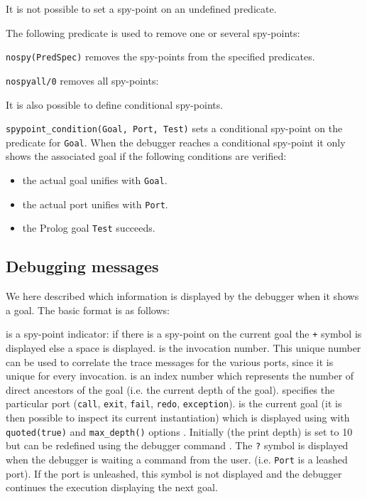 It is not possible to set a spy-point on an undefined predicate. 

The following predicate is used to remove one or several spy-points:

\texttt{nospy(PredSpec)} removes the spy-points from the specified
predicates.

\texttt{nospyall/0} removes all spy-points:

It is also possible to define conditional spy-points. 

\texttt{spypoint\_condition(Goal, Port, Test)} sets a
conditional spy-point on the predicate for \texttt{Goal}. When the debugger
reaches a conditional spy-point it only shows the associated goal if the 
following conditions are verified:

\begin{itemize}

\item the actual goal unifies with \texttt{Goal}.

\item the actual port unifies with \texttt{Port}.

\item the Prolog goal \texttt{Test} succeeds.

\end{itemize}

\subsection{Debugging messages}
We here described which information is displayed by the debugger when it
shows a goal. The basic format is as follows: 


 is a spy-point indicator: if there is a spy-point on the
current goal the \texttt{+} symbol is displayed else a space is displayed.
 is the invocation number. This unique number can be used
to correlate the trace messages for the various ports, since it is unique
for every invocation.  is an index number which
represents the number of direct ancestors of the goal (i.e. the current
depth of the goal).  specifies the particular port
(\texttt{call}, \texttt{exit}, \texttt{fail}, \texttt{redo},
\texttt{exception}).  is the current goal (it is then
possible to inspect its current instantiation) which is displayed using
 with \texttt{quoted(true)} and
\texttt{max\_depth()} options . Initially
 (the print depth) is set to 10 but can be redefined
using the \texttt{{\lt}} debugger command . The
\texttt{?} symbol is displayed when the debugger is waiting a command from
the user. (i.e. \texttt{Port} is a leashed port). If the port is unleashed,
this symbol is not displayed and the debugger continues the execution
displaying the next goal.

